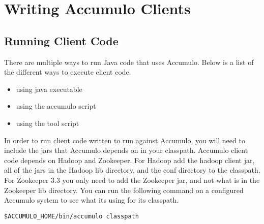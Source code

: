 
%
%

\chapter{Writing Accumulo Clients}

\section{Running Client Code}

There are multiple ways to run Java code that uses Accumulo. Below is a list
of the different ways to execute client code.

\begin{itemize} 
  \item using java executable 
  \item using the accumulo script
  \item using the tool script 
\end{itemize}

In order to run client code written to run against Accumulo, you will need to
include the jars that Accumulo depends on in your classpath. Accumulo client
code depends on Hadoop and Zookeeper. For Hadoop add the hadoop client jar, all
of the jars in the Hadoop lib directory, and the conf directory to the
classpath. For Zookeeper 3.3 you only need to add the Zookeeper jar, and not
what is in the Zookeeper lib directory. You can run the following command on a
configured Accumulo system to see what its using for its classpath.

\small 
\begin{verbatim} 
$ACCUMULO_HOME/bin/accumulo classpath
\end{verbatim}
\normalsize

